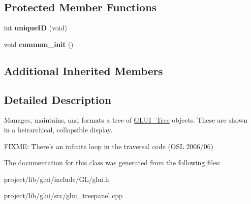 \subsection*{Protected Member Functions}
\begin{DoxyCompactItemize}
\item 
\hypertarget{classGLUI__TreePanel_aeb4b329f0f779c8f289c3efdb9ecd258}{int {\bfseries unique\-I\-D} (void)}\label{classGLUI__TreePanel_aeb4b329f0f779c8f289c3efdb9ecd258}

\item 
\hypertarget{classGLUI__TreePanel_a0584049c802c2074a86367053b2d2e20}{void {\bfseries common\-\_\-init} ()}\label{classGLUI__TreePanel_a0584049c802c2074a86367053b2d2e20}

\end{DoxyCompactItemize}
\subsection*{Additional Inherited Members}


\subsection{Detailed Description}
Manages, maintains, and formats a tree of \hyperlink{classGLUI__Tree}{G\-L\-U\-I\-\_\-\-Tree} objects. These are shown in a heirarchical, collapsible display.

F\-I\-X\-M\-E\-: There's an infinite loop in the traversal code (O\-S\-L 2006/06) 

The documentation for this class was generated from the following files\-:\begin{DoxyCompactItemize}
\item 
project/lib/glui/include/\-G\-L/glui.\-h\item 
project/lib/glui/src/glui\-\_\-treepanel.\-cpp\end{DoxyCompactItemize}
